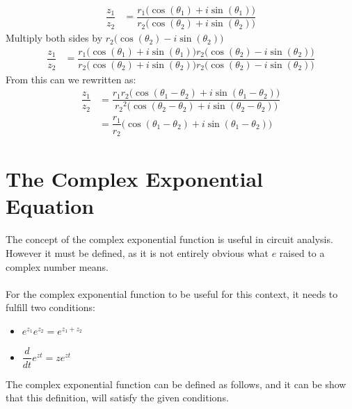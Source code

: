 \begin{prof}{}{}
\begin{align}
\dfrac{z_1}{z_2}&=\dfrac{r_1\bigg(\cos(\theta_1)+i\sin(\theta_1)\bigg)}{r_2\bigg(\cos(\theta_2)+i\sin(\theta_2)\bigg)}
\end{align}
Multiply both sides by $r_2\bigg(\cos(\theta_2)-i\sin(\theta_2)\bigg)$
\begin{align}
\dfrac{z_1}{z_2}&=\dfrac{r_1\bigg(\cos(\theta_1)+i\sin(\theta_1)\bigg)r_2\bigg(\cos(\theta_2)-i\sin(\theta_2)\bigg)}{r_2\bigg(\cos(\theta_2)+i\sin(\theta_2)\bigg)r_2\bigg(\cos(\theta_2)-i\sin(\theta_2)\bigg)}
\end{align}
From  this can we rewritten as:
\begin{align}
\dfrac{z_1}{z_2}&=\dfrac{r_1r_2\bigg(\cos(\theta_1-\theta_2)+i\sin(\theta_1-\theta_2)\bigg)}{{r_2}^2\bigg(\cos(\theta_2-\theta_2)+i\sin(\theta_2-\theta_2)\bigg)}
\\
&=\dfrac{r_1}{r_2}\Big( \cos(\theta_1-\theta_2)+ i \sin(\theta_1-\theta_2)\Big)
\end{align}
\end{prof}
\section{The Complex Exponential Equation}
The concept of the complex exponential function is useful in circuit analysis. However it must be defined, as it is not entirely obvious what $e$ raised to a complex number means.
\\
\\
For the complex exponential function to be useful for this context, it needs to fulfill two conditions:
\begin{itemize}
	\item $e^{z_1}e^{z_2} = e^{z_1 + z_2}$
	\item $\dfrac{d}{dt}e^{zt} = ze^{zt}$
\end{itemize}
The complex exponential function can be defined as follows, and it can be show that this definition, will satisfy the given conditions.

